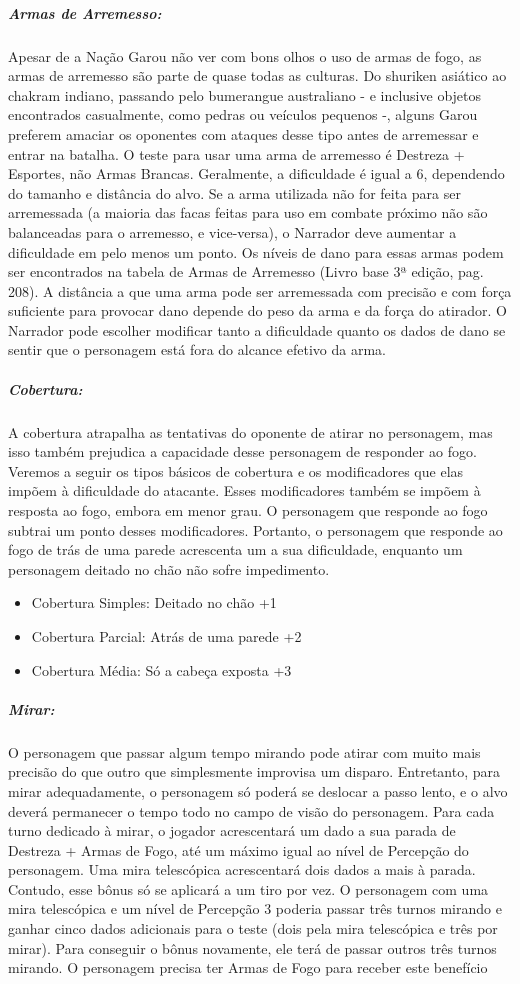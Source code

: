 \subparagraph{\bf Armas de Arremesso:}
Apesar de a Nação Garou não ver com bons olhos o uso de armas de fogo, as armas de arremesso são parte de quase todas as culturas. Do shuriken asiático ao chakram indiano, passando pelo bumerangue australiano - e inclusive objetos encontrados casualmente, como pedras ou veículos pequenos -, alguns Garou preferem amaciar os oponentes com ataques desse tipo antes de arremessar e entrar na batalha. O teste para usar uma arma de arremesso é Destreza + Esportes, não Armas Brancas. Geralmente, a dificuldade é igual a 6, dependendo do tamanho e distância do alvo. Se a arma utilizada não for feita para ser arremessada (a maioria das facas feitas para uso em combate próximo não são balanceadas para o arremesso, e vice-versa), o Narrador deve aumentar a dificuldade em pelo menos um ponto. Os níveis de dano para essas armas podem ser encontrados na tabela de Armas de Arremesso (Livro base 3ª edição, pag. 208). 
A distância a que uma arma pode ser arremessada com precisão e com força suficiente para provocar dano depende do peso da arma e da força do atirador. O Narrador pode escolher modificar tanto a dificuldade quanto os dados de dano se sentir que o personagem está fora do alcance efetivo da arma.

\subparagraph{\bf Cobertura:}
A cobertura atrapalha as tentativas do oponente de atirar no personagem, mas isso também prejudica a capacidade desse personagem de responder ao fogo. Veremos a seguir os tipos básicos de cobertura e os modificadores que elas impõem à dificuldade do atacante. Esses modificadores também se impõem à resposta ao fogo, embora em menor grau. O personagem que responde ao fogo subtrai um ponto desses modificadores. Portanto, o personagem que responde ao fogo de trás de uma parede acrescenta um a sua dificuldade, enquanto um personagem deitado no chão não sofre impedimento.
\begin{itemize}[noitemsep]
\item Cobertura Simples: Deitado no chão +1
\item Cobertura Parcial: Atrás de uma parede +2
\item Cobertura Média: Só a cabeça exposta +3
\end{itemize}

\subparagraph{\bf Mirar:}
O personagem que passar algum tempo mirando pode atirar com muito mais precisão do que outro que simplesmente improvisa um disparo. Entretanto, para mirar adequadamente, o personagem só poderá se deslocar a passo lento, e o alvo deverá permanecer o tempo todo no campo de visão do personagem.
Para cada turno dedicado à mirar, o jogador acrescentará um dado a sua parada de Destreza + Armas de Fogo, até um máximo igual ao nível de Percepção do personagem. Uma mira telescópica acrescentará dois dados a mais à parada. Contudo, esse bônus só se aplicará a um tiro por vez. O personagem com uma mira telescópica e um nível de Percepção 3 poderia passar três turnos mirando e ganhar cinco dados adicionais para o teste (dois pela mira telescópica e três por mirar). Para conseguir o bônus novamente, ele terá de passar outros três turnos mirando.
O personagem precisa ter Armas de Fogo para receber este benefício


